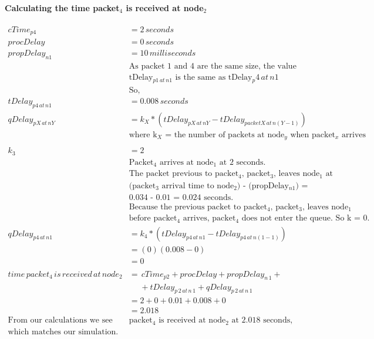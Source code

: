 \documentclass[fleqn,11pt]{article}
\begin{document}
\paragraph{Calculating the time packet$_4$ is received at node$_2$ }
\begin{align*}
cTime_{p4} &= 2\,seconds\\
procDelay &= 0\,seconds\\
propDelay_{n1} &= 10\,milliseconds\\
&\text{As packet 1 and 4 are the same size, the value for}\\
&\text{tDelay$_{p1\,at\,n1}$ is the same as tDelay${_p4\,at\,n1}$}\\
&\text{So,}\\
tDelay_{p4\,at\,n1} &=  0.008 \,seconds\\
qDelay_{pX\,at\,nY} &= k_{X}*(tDelay_{pX\,at\,nY} - tDelay_{packetX\,at\,n(Y-1)}) \\
&\text{where k$_X$ = the number of packets at node$_y$ when packet$_x$ arrives}\\
\\
k_{3} &= 2\\
&\text{Packet$_ 4$ arrives at node$_1$ at 2 seconds.}\\
&\text{The packet previous to packet$_4$, packet$_3$, leaves node$_1$ at}\\
&\text{(packet$_3$ arrival time to node$_2$) - (propDelay$_{n1}$) =}\\
&\text{0.034 - 0.01 = 0.024 seconds. }\\
&\text{Because the previous packet to packet$_4$, packet$_3$, leaves node$_1$}\\
&\text{before packet$_4$ arrives, packet$_4$ does not enter the queue. So k = 0.} \\
qDelay_{p4\,at\,n1} &= k_{4}*(tDelay_{p4\,at\,n1} - tDelay_{p4\,at\,n(1-1)})\\
&= (0) (0.008 - 0) \\
&= 0 \\
\\
time\,packet_{4}\,is\,received\,at\,node_{2}  &= \,cTime_{p2} + procDelay + propDelay_{n\,1} +\\
&\,\,\,\,\,\,\,\, + tDelay_{p\,2\,at\,n\,1} + qDelay_{p\,2\,at\,n\,1} \\
&= 2 + 0 + 0.01 + 0.008 + 0 \\
&= 2.018\\
\text{From our calculations we see that }
&\text{packet$_4$ is received at node$_2$ at 2.018 seconds,} \\
\text{which matches our simulation.}
\end{align*}
\end{document}
